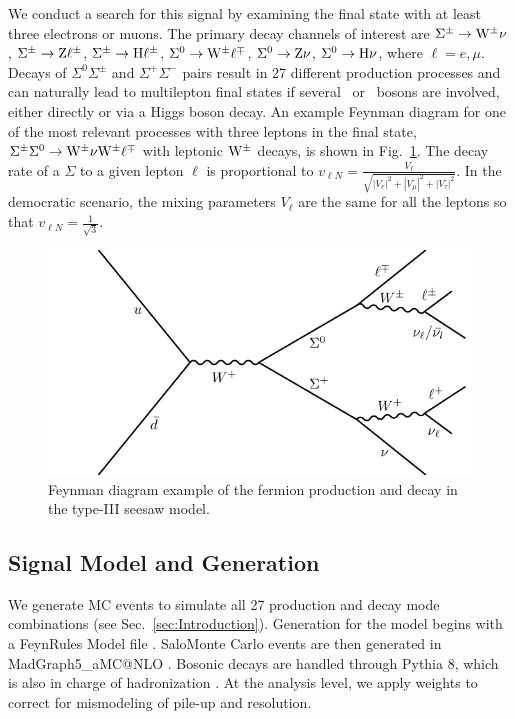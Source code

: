 We conduct a search for this signal by examining the final state with at least three electrons or muons. The primary decay channels of interest are $\Sigma^\pm \to \mathrm{W}^\pm \nu$, $\Sigma^\pm \to \mathrm{Z} \ell^\pm$, $\Sigma^\pm \to \mathrm{H} \ell^\pm$, $\Sigma^0 \to \mathrm{W}^\pm \ell^\mp$, $\Sigma^0 \to \mathrm{Z} \nu$, $\Sigma^0 \to \mathrm{H} \nu$, where $\ell = e, \mu$. Decays of $\Sigma^0 \Sigma^\pm$ and $\Sigma^+ \Sigma^-$ pairs result in 27 different production processes and can naturally lead to multilepton final states if several \PW\ or \Z\ bosons are involved, either directly or via a Higgs boson decay. An example Feynman diagram for one of the most relevant processes with three leptons in the final state, $\Sigma^\pm \Sigma^0 \to \mathrm{W}^\pm \nu \mathrm{W}^\pm \ell^\mp$ with leptonic $\mathrm{W}^\pm$ decays, is shown in Fig.~\ref{fig:SeesawDecay}.
The decay rate of a $\Sigma$ to a given lepton $\ell$ is proportional to $v_{\ell N} = \frac{V_\ell}{\sqrt{|V_e|^2 + |V_\mu|^2 + |V_\tau|^2}}$. In the democratic scenario, the mixing parameters $V_\ell$ are the same for all the leptons so that $v_{\ell N} = \frac{1}{\sqrt{3}}$.

\begin{figure}
\begin{center}
	\includegraphics[width=.5\textwidth]{Introduction/Seesaw}
	\caption{Feynman diagram example of the fermion production and decay in the type-III seesaw model.
	\label{fig:SeesawDecay}}
\end{center}
\end{figure}


\subsection{Signal Model and Generation}
\label{sec:Samples/Signal}

We generate MC events to simulate all 27 production and decay mode combinations (see Sec.~\ref{sec:Introduction}). Generation for the model begins with a FeynRules Model file \cite{SeesawIII_Biggio}. SaloMonte Carlo events are then generated in MadGraph5\_aMC@NLO \cite{Alwall:2011uj}. Bosonic decays are handled through Pythia 8, which is also in charge of hadronization \cite{Sjostrand:2007gs}. At the analysis level, we apply weights to correct for mismodeling of pile-up and \MET resolution.

